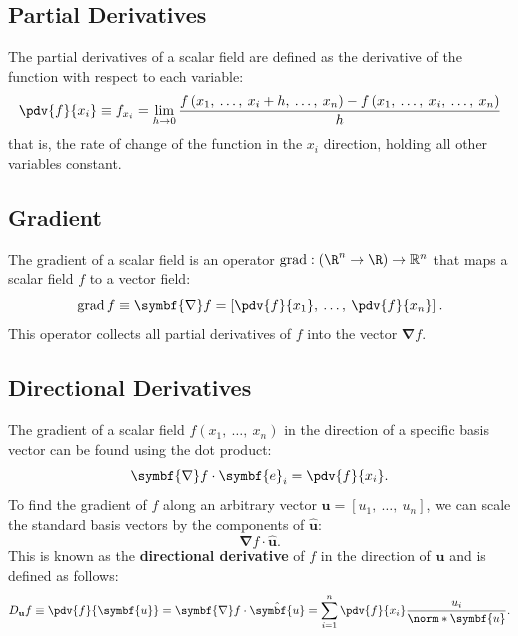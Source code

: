 \documentclass{article}
\DeclareMathOperator{\grad}{grad}
\begin{document}
\subsection{Partial Derivatives}
The partial derivatives of a scalar field are defined as the derivative
of the function with respect to each variable:
\begin{equation*}
    \pdv{f}{x_i} \equiv f_{x_i} = \lim_{h \to 0} \frac{f\left( x_1, \: \ldots, \: x_i + h, \: \ldots, \: x_n \right) - f\left( x_1, \: \ldots, \: x_i, \: \ldots, \: x_n \right)}{h}
\end{equation*}
that is, the rate of change of the function in the \(x_i\) direction,
holding all other variables constant.
\subsection{Gradient}
The gradient of a scalar field is an operator \(\grad : \left( \R^n \to
\R \right) \to \mathbb{R}^n\) that maps a scalar field \(f\) to a
vector field:
\begin{equation*}
    \grad{f} \equiv \symbf{\nabla} f = \left[ \pdv{f}{x_1}, \: \ldots, \: \pdv{f}{x_n} \right].
\end{equation*}
This operator collects all partial derivatives of \(f\) into the vector
\(\symbf{\nabla} f\).
\subsection{Directional Derivatives}
The gradient of a scalar field \(f\left( x_1, \: \ldots, \: x_n
\right)\) in the direction of a specific basis vector can be found
using the dot product:
\begin{equation*}
    \symbf{\nabla} f \cdot \symbf{e}_i = \pdv{f}{x_i}.
\end{equation*}
To find the gradient of \(f\) along an arbitrary vector \(\mathbf{u} =
\left[ u_1, \: \ldots, \: u_n \right]\), we can scale the standard basis
vectors by the components of \(\hat{\mathbf{u}}\):
\begin{equation*}
    \symbf{\nabla} f \cdot \hat{\symbf{u}}.
\end{equation*}
This is known as the \textbf{directional derivative} of \(f\) in the
direction of \(\mathbf{u}\) and is defined as follows:
\begin{equation*}
    D_{\mathbf{u}} f \equiv \pdv{f}{\symbf{u}} = \symbf{\nabla} f \cdot \hat{\symbf{u}} = \sum_{i=1}^{n} \pdv{f}{x_i} \frac{u_i}{\norm*{\symbf{u}}}.
\end{equation*}
\end{document}
